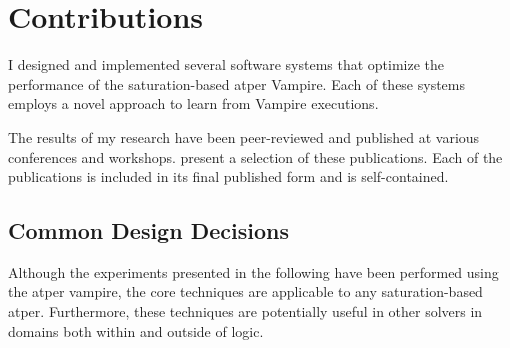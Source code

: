 
\section{Contributions}
\label{sec:contributions}



I designed and implemented several software systems that optimize the performance of the saturation-based \gls{atper} Vampire.
Each of these systems employs a novel approach to learn from Vampire executions.

The results of my research have been peer-reviewed and published at various conferences and workshops.
present a selection of these publications.
Each of the publications is included in its final published form and is self-contained.

\subsection{Common Design Decisions}

Although the experiments presented in the following have been performed using the \gls{atper} \gls{vampire},
the core techniques are applicable to any \gls{saturation}-based \gls{atper}.
Furthermore, these techniques are potentially useful in other solvers in domains both within and outside of logic.

